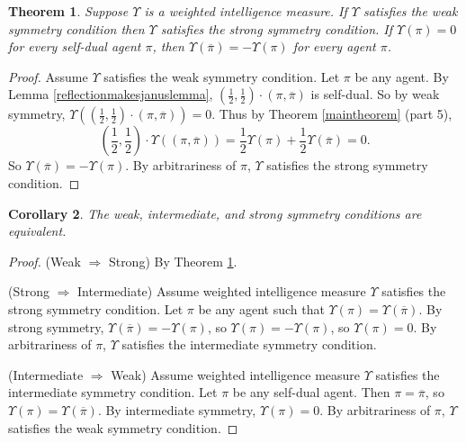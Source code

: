 \documentclass[twoside]{article}
\newtheorem{theorem}{Theorem}
\newtheorem{corollary}[theorem]{Corollary}
\begin{document}
\begin{theorem}
\label{weakimpliesstrongthm}
    Suppose $\Upsilon$ is a weighted intelligence measure.
    If $\Upsilon$ satisfies the weak symmetry condition then
    $\Upsilon$ satisfies the strong symmetry condition.
    If $\Upsilon(\pi)=0$ for every self-dual agent $\pi$,
    then $\Upsilon(\overline{\pi})=-\Upsilon(\pi)$
    for every agent $\pi$.
\end{theorem}

\begin{proof}
    Assume $\Upsilon$ satisfies the weak symmetry condition.
    Let $\pi$ be any agent.
    By Lemma \ref{reflectionmakesjanuslemma},
    $(\frac12,\frac12)\cdot(\pi,\overline\pi)$ is self-dual.
    So by weak symmetry,
    $\Upsilon((\frac12,\frac12)\cdot(\pi,\overline\pi))=0$.
    Thus by Theorem \ref{maintheorem} (part 5),
    \[
        (\mbox{$\frac12$},\mbox{$\frac12$})\cdot\Upsilon((\pi,\overline\pi))
        =\mbox{$\frac12$}\Upsilon(\pi)+\mbox{$\frac12$}\Upsilon(\overline\pi)=0.
    \]
    So $\Upsilon(\overline{\pi})=-\Upsilon(\pi)$.
    By arbitrariness of $\pi$, $\Upsilon$ satisfies the strong
    symmetry condition.
\end{proof}

\begin{corollary}
\label{equivalentsymmetriescor}
    The weak, intermediate, and strong symmetry conditions are equivalent.
\end{corollary}

\begin{proof}
    (Weak $\Rightarrow$ Strong) By Theorem \ref{weakimpliesstrongthm}.

    (Strong $\Rightarrow$ Intermediate) Assume weighted intelligence measure
    $\Upsilon$ satisfies the strong symmetry condition.
    Let $\pi$ be any agent such that $\Upsilon(\pi)=\Upsilon(\overline\pi)$.
    By strong symmetry, $\Upsilon(\overline\pi)=-\Upsilon(\pi)$,
    so $\Upsilon(\pi)=-\Upsilon(\pi)$, so $\Upsilon(\pi)=0$.
    By arbitrariness of $\pi$, $\Upsilon$ satisfies the intermediate
    symmetry condition.

    (Intermediate $\Rightarrow$ Weak)
    Assume weighted intelligence measure
    $\Upsilon$ satisfies the intermediate symmetry condition.
    Let $\pi$ be any self-dual agent.
    Then $\pi=\overline{\pi}$, so $\Upsilon(\pi)=\Upsilon(\overline{\pi})$.
    By intermediate symmetry, $\Upsilon(\pi)=0$.
    By arbitrariness of $\pi$, $\Upsilon$ satisfies the weak symmetry
    condition.
\end{proof}
\end{document}

